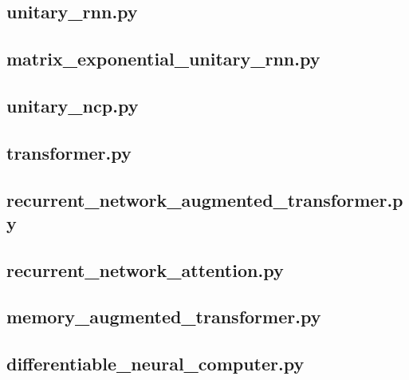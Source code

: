 \documentclass[draft,final]{vutinfth} %
\begin{document}
    \subsection{unitary\_rnn.py}
    
    \subsection{matrix\_exponential\_unitary\_rnn.py}
    
    \subsection{unitary\_ncp.py}
    
    \subsection{transformer.py}
    
    \subsection{recurrent\_network\_augmented\_transformer.py}
    
    \subsection{recurrent\_network\_attention.py}
    
    \subsection{memory\_augmented\_transformer.py}
    
    \subsection{differentiable\_neural\_computer.py}
    
\end{document}
